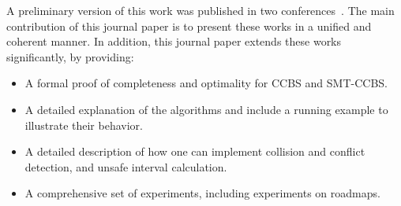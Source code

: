 \documentclass[review]{elsarticle}
\newcommand\konstantin[1]{\nb{\textbf{Konstantin:}}{red}{#1}}
\newcommand\roni[1]{\nb{\textbf{Roni:}}{green}{#1}}
\newcommand\pavel[1]{\nb{\textbf{Pavel:}}{blue}{#1}}
\newcommand{\ccbs}{\ac{CCBS}\xspace}
\newcommand{\cbs}{\ac{CBS}\xspace}
\newcommand{\smtccbs}{SMT-CCBS\xspace}
\newcommand{\mapf}{\ac{MAPF}\xspace}
\begin{document}



A preliminary version of this work was published in two conferences~\cite{andreychuk2019multi,DBLP:conf/socs/Surynek19}.  
The main contribution of this journal paper is to present these works in a unified and coherent manner. In addition, this journal paper extends these works significantly, by providing:
\begin{itemize}
    \item A formal proof of completeness and optimality for \ccbs and \smtccbs.
    \item A detailed explanation of the algorithms and include a running example to illustrate their behavior. 
    \item A detailed description of how one can implement collision and conflict detection, and unsafe interval calculation.
    \item A comprehensive set of experiments, including experiments on roadmaps. 
\end{itemize}
\end{document}
